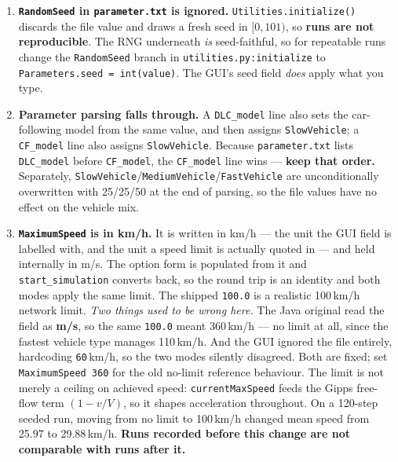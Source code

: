 \documentclass[11pt, a4paper]{article}
\newcommand{\code}[1]{\texttt{#1}}
\begin{document}
\begin{enumerate}
    \item \label{quirk:seed} \textbf{\code{RandomSeed} in \code{parameter.txt} is
    ignored.} \code{Utilities.initialize()} discards the file value and draws a
    fresh seed in $[0, 101)$, so \textbf{runs are not reproducible}. The RNG
    underneath \emph{is} seed-faithful, so for repeatable runs change the
    \code{RandomSeed} branch in \code{utilities.py:initialize} to
    \code{Parameters.seed = int(value)}. The GUI's seed field \emph{does} apply
    what you type.

    \item \label{quirk:fallthrough} \textbf{Parameter parsing falls through.} A
    \code{DLC\_model} line also sets the car-following model from the same value,
    and then assigns \code{SlowVehicle}; a \code{CF\_model} line also assigns
    \code{SlowVehicle}. Because \code{parameter.txt} lists \code{DLC\_model}
    before \code{CF\_model}, the \code{CF\_model} line wins --- \textbf{keep that
    order.} Separately, \code{SlowVehicle}/\code{MediumVehicle}/\code{FastVehicle}
    are unconditionally overwritten with 25/25/50 at the end of parsing, so the
    file values have no effect on the vehicle mix.

    \item \textbf{\code{MaximumSpeed} is in km/h.} It is written in km/h ---
    the unit the GUI field is labelled with, and the unit a speed limit is
    actually quoted in --- and held internally in m/s. The option form is
    populated from it and \code{start\_simulation} converts back, so the round
    trip is an identity and both modes apply the same limit. The shipped
    \code{100.0} is a realistic 100\,km/h network limit.
    \emph{Two things used to be wrong here.} The Java original read the field as
    \textbf{m/s}, so the same \code{100.0} meant 360\,km/h --- no limit at all,
    since the fastest vehicle type manages 110\,km/h. And the GUI ignored the
    file entirely, hardcoding \code{60}\,km/h, so the two modes silently
    disagreed. Both are fixed; set \code{MaximumSpeed 360} for the old no-limit
    reference behaviour. The limit is not merely a ceiling on achieved speed:
    \code{currentMaxSpeed} feeds the Gipps free-flow term $(1 - v/V)$, so it
    shapes acceleration throughout. On a 120-step seeded run, moving from no
    limit to 100\,km/h changed mean speed from 25.97 to 29.88\,km/h.
    \textbf{Runs recorded before this change are not comparable with runs after
    it.}


\end{enumerate}
\end{document}
